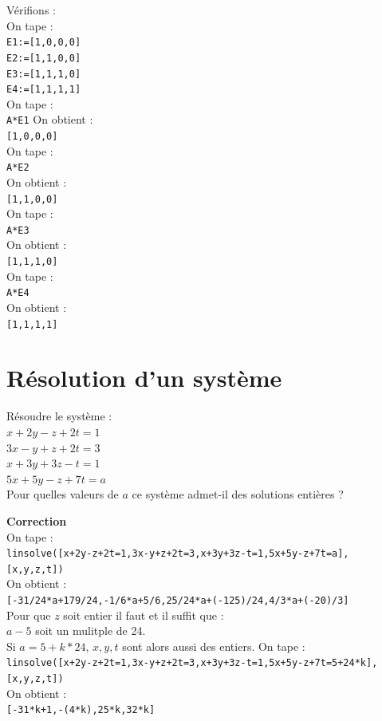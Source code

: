 \documentclass[a4paper,11pt]{book}
\begin{document}
V\'erifions :\\
On tape :\\
{\tt E1:=[1,0,0,0]}\\
{\tt E2:=[1,1,0,0]}\\
{\tt E3:=[1,1,1,0]}\\
{\tt E4:=[1,1,1,1]}\\
On tape :\\
{\tt A*E1}
On obtient :\\
{\tt [1,0,0,0]}\\
On tape :\\
{\tt A*E2}\\
On obtient :\\
{\tt [1,1,0,0]}\\
On tape :\\
{\tt  A*E3}\\
On obtient :\\
{\tt [1,1,1,0]}\\
On tape :\\
{\tt A*E4}\\
On obtient :\\
{\tt [1,1,1,1]}

\section{R\'esolution d'un syst\`eme}
R\'esoudre le syst\`eme :\\
$x+2y-z+2t=1$\\
$3x-y+z+2t=3$\\
$x+3y+3z-t=1$\\
$5x+5y-z+7t=a$\\
Pour quelles valeurs de $a$ ce syst\`eme admet-il des solutions enti\`eres ?

{\bf Correction}\\
On tape :\\
{\tt linsolve([x+2y-z+2t=1,3x-y+z+2t=3,x+3y+3z-t=1,5x+5y-z+7t=a],}\\
{\tt [x,y,z,t])}\\
On obtient :\\
{\tt [-31/24*a+179/24,-1/6*a+5/6,25/24*a+(-125)/24,4/3*a+(-20)/3]}\\
Pour que $z$ soit entier il faut et il suffit que :\\
$a-5$ soit un mulitple de 24.\\
Si $a=5+k*24$, $x,y,t$ sont alors aussi des entiers.
On tape :\\
{\tt linsolve([x+2y-z+2t=1,3x-y+z+2t=3,x+3y+3z-t=1,5x+5y-z+7t=5+24*k],}\\
{\tt [x,y,z,t])}\\
On obtient :\\
{\tt [-31*k+1,-(4*k),25*k,32*k]}
\end{document}

